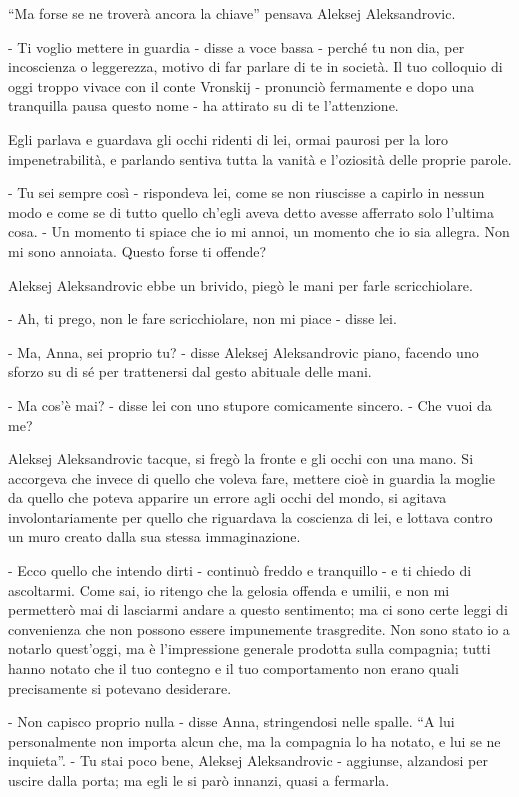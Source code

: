 ``Ma forse se ne troverà ancora la chiave'' pensava Aleksej Aleksandrovic. 

- Ti voglio mettere in guardia - disse a voce bassa - perché tu non dia, per incoscienza o leggerezza, motivo di far parlare di te in società. Il tuo colloquio di oggi troppo vivace con il conte Vronskij - pronunciò fermamente e dopo una tranquilla pausa questo nome - ha attirato su di te l'attenzione. 

Egli parlava e guardava gli occhi ridenti di lei, ormai paurosi per la loro impenetrabilità, e parlando sentiva tutta la vanità e l'oziosità delle proprie parole. 

- Tu sei sempre così - rispondeva lei, come se non riuscisse a capirlo in nessun modo e come se di tutto quello ch'egli aveva detto avesse afferrato solo l'ultima cosa. - Un momento ti spiace che io mi annoi, un momento che io sia allegra. Non mi sono annoiata. Questo forse ti offende? 

Aleksej Aleksandrovic ebbe un brivido, piegò le mani per farle scricchiolare. 

- Ah, ti prego, non le fare scricchiolare, non mi piace - disse lei. 

- Ma, Anna, sei proprio tu? - disse Aleksej Aleksandrovic piano, facendo uno sforzo su di sé per trattenersi dal gesto abituale delle mani. 

- Ma cos'è mai? - disse lei con uno stupore comicamente sincero. - Che vuoi da me? 

Aleksej Aleksandrovic tacque, si fregò la fronte e gli occhi con una mano. Si accorgeva che invece di quello che voleva fare, mettere cioè in guardia la moglie da quello che poteva apparire un errore agli occhi del mondo, si agitava involontariamente per quello che riguardava la coscienza di lei, e lottava contro un muro creato dalla sua stessa immaginazione. 

- Ecco quello che intendo dirti - continuò freddo e tranquillo - e ti chiedo di ascoltarmi. Come sai, io ritengo che la gelosia offenda e umilii, e non mi permetterò mai di lasciarmi andare a questo sentimento; ma ci sono certe leggi di convenienza che non possono essere impunemente trasgredite. Non sono stato io a notarlo quest'oggi, ma è l'impressione generale prodotta sulla compagnia; tutti hanno notato che il tuo contegno e il tuo comportamento non erano quali precisamente si potevano desiderare. 

- Non capisco proprio nulla - disse Anna, stringendosi nelle spalle. ``A lui personalmente non importa alcun che, ma la compagnia lo ha notato, e lui se ne inquieta''. - Tu stai poco bene, Aleksej Aleksandrovic - aggiunse, alzandosi per uscire dalla porta; ma egli le si parò innanzi, quasi a fermarla. 

